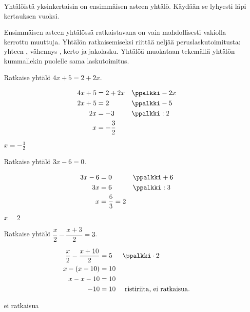 Yhtälöistä yksinkertaisin on ensimmäisen asteen yhtälö. Käydään se lyhyesti läpi kertauksen vuoksi.

Ensimmäisen asteen yhtälössä ratkaistavana on vain mahdollisesti vakiolla kerrottu muuttuja. Yhtälön ratkaisemiseksi riittää neljää peruslaskutoimitusta: yhteen-, vähennys-, kerto ja jakolasku. Yhtälöä muokataan tekemällä yhtälön kummallekin puolelle sama laskutoimitus.



\begin{esimerkki}
Ratkaise yhtälö $4x + 5 = 2 + 2x$.
	\begin{esimratk}
\begin{align*}
    4x + 5 &= 2 + 2x && \ppalkki -2x \\
    2x + 5 &= 2      && \ppalkki -5 \\
        2x &= -3     && \ppalkki :2 \\
         x &= -\frac{3}{2}
 \end{align*}
	\end{esimratk}
	\begin{esimvast}
$x=-\frac{3}{2}$
	\end{esimvast}
\end{esimerkki}

\begin{esimerkki}
Ratkaise yhtälö $3x - 6 = 0$.
	\begin{esimratk}
  \begin{align*}
    3x - 6 &= 0 && \ppalkki +6 \\
        3x &= 6 && \ppalkki :3 \\
         x &= \frac{6}{3}  = 2 \\
  \end{align*}
	\end{esimratk}
	\begin{esimvast}
$x=2$
	\end{esimvast}
\end{esimerkki}

\begin{esimerkki}
Ratkaise yhtälö $\dfrac{x}{2}-\dfrac{x+3}{2}=3$.
	\begin{esimratk}
  \begin{align*}
    \frac{x}{2}-\frac{x+10}{2}&=5 && \ppalkki \cdot 2 \\
        x-(x+10) &= 10  \\
         x-x-10 &= 10 \\
         -10 &= 10 && \text{ ristiriita, ei ratkaisua.}
  \end{align*}
	\end{esimratk}
	\begin{esimvast}
ei ratkaisua
	\end{esimvast}
\end{esimerkki}

